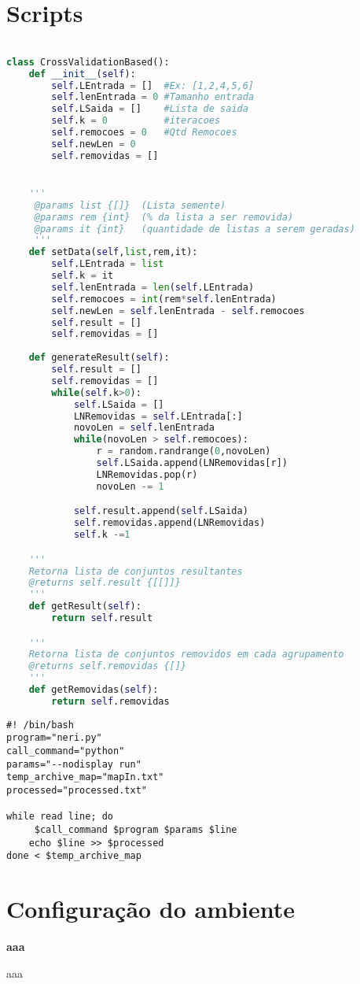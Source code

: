 


\chapter{Scripts}

\tiny
\label{CVV_script}
\begin{lstlisting}[caption={Script em Python para geração dos experimentos com remoção de mais de um gene semente.},label=getBlockStatic,language=Python]

class CrossValidationBased():
	def __init__(self):
		self.LEntrada = []  #Ex: [1,2,4,5,6]
		self.lenEntrada = 0 #Tamanho entrada
		self.LSaida = []    #Lista de saida
		self.k = 0          #iteracoes
		self.remocoes = 0   #Qtd Remocoes
		self.newLen = 0 
		self.removidas = []


	''' 
	 @params list {[]}	(Lista semente)
	 @params rem {int}	(% da lista a ser removida)
	 @params it {int}	(quantidade de listas a serem geradas)
	 ''' 
	def setData(self,list,rem,it):
		self.LEntrada = list
		self.k = it
		self.lenEntrada = len(self.LEntrada)
		self.remocoes = int(rem*self.lenEntrada)
		self.newLen = self.lenEntrada - self.remocoes
		self.result = []
		self.removidas = []
		
	def generateResult(self):
		self.result = []
		self.removidas = []
		while(self.k>0):
			self.LSaida = []
			LNRemovidas = self.LEntrada[:]
			novoLen = self.lenEntrada
			while(novoLen > self.remocoes):
				r = random.randrange(0,novoLen)
				self.LSaida.append(LNRemovidas[r])
				LNRemovidas.pop(r)
				novoLen -= 1

			self.result.append(self.LSaida)
			self.removidas.append(LNRemovidas)
			self.k -=1

    '''
    Retorna lista de conjuntos resultantes
    @returns self.result {[[]]}
    '''
	def getResult(self):
		return self.result

    '''
    Retorna lista de conjuntos removidos em cada agrupamento
    @returns self.removidas {[]}
    '''
	def getRemovidas(self):
		return self.removidas


\end{lstlisting}



\tiny
\label{shell_run_all}
\begin{lstlisting}[caption={Script em \textsl{Shell} para execução automatizada dos experimentos.},label=getBlockStatic,language=Shell]
#! /bin/bash
program="neri.py"
call_command="python"
params="--nodisplay run"
temp_archive_map="mapIn.txt"
processed="processed.txt"

while read line; do
	 $call_command $program $params $line
	echo $line >> $processed
done < $temp_archive_map

\end{lstlisting}



\chapter{Configuração do ambiente}

\noindent \textbf{aaa}

\par aaa

